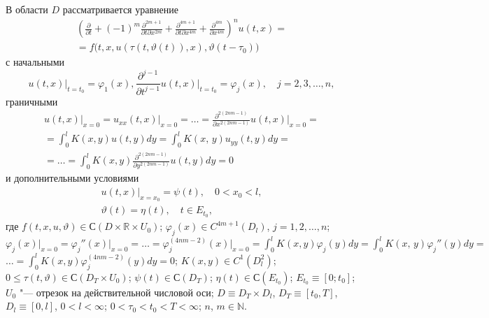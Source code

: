 

\date{25/I/2012}

\maketitle



 В области $D$ рассматривается
уравнение
\begin{multline}
\label{uld:eq1}
 \left( \frac{\partial}{\partial
t}+(-1)^m\frac{\partial ^{2m+1}}{\partial t \partial x^{2
m}}+\frac{\partial ^{4m+1}}{\partial t\partial x^{4
m}}+\frac{\partial ^{4
m}}{\partial  x^{4 m}}\right)^n u (t, x)=\\
 =f  \bigl(t , x ,  u (  \tau  (t, \vartheta  (t)), x ), \vartheta
 (t-\tau _0) \bigr)
\end{multline}
с начальными 
\begin{equation}
\label{uld:eq3}
u (t, x)\Big|_{t=t_0} =\varphi _1 ( x),  \frac{\partial^{j-1}}{\partial
t^{j-1}} u (t, x) \Big|_{t=t_0} =\varphi _j( x), \quad  j={2, 3, \dots, n},
\end{equation}
граничными 
\begin{multline}
\label{uld:eq3}
u (t, x) \big|_{x=0} =u_{ x x} (t , x) \big|_{ x=0}  = \ldots =\frac{\partial^{2(2 n m-1)}}{\partial
 x^{2 (2 n m-1)}} u (t,  x) \Big|_{x=0} = \\
 =\int_0^l K (x , y) u (t , y) d y=\int_0^l
K (x,\,y) u_{ y y}  (t, y) d y= \\
 =\ldots=\int_0^l K (x , y)  \frac{\partial
^{ 2 (2 n m-1)}}{\partial
 y^{ 2 (2 n m-1)}} u (t,  y) dy=0
 \end{multline}
 и дополнительными условиями
\begin{gather}
\label{uld:eq4}
u (t,  x) \big|_{x=x_0} = \psi(t), \quad  0<x_0<l,\\
\label{uld:eq5}
\vartheta  (t)=\eta(t), \quad  t \in E_{t_0},
\end{gather}
где $f (t, x, u, \vartheta) \in С (D \times \mathbb R \times U_0)$; 
$\varphi_j  (x) \in C^{4 m+1} (D_l)$, $j={1 , 2, \dots, n}$;
$\displaystyle \varphi_j (x) \big|_{x=0} =\varphi _j''(x) \big|_{x=0} {=}\ldots{=}\varphi _j^{(4 n m-2)} (x) \big|_{ x=0} {=}
\int_0^l K (x , y) \varphi _j (y) d y=\int_0^l K (x,\,y) \varphi _j''(y) d y
=$ $ \displaystyle\ldots {=}\int_0^l K (x , y) \varphi _j^{(4 n m-2)} (y) d y=0$;  
$K (x , y)\in C^1(D_l^2)$; 
$0\le \tau  (t , \vartheta )\in С (D_T \times U_0 )$; 
$\psi   (t)\in С (D_T)$; 
$\eta   (t)\in С (E_{ t_0} )$; 
$E_{t_0} \equiv [0 ;   t_0]$; 
$U_0$ "--- отрезок на действительной числовой оси; $D\equiv D_T \times D_l$, 
$D_T \equiv [t_0, T]$, $D_l \equiv [0 , l]$, $0<l<\infty$; $0<\tau _0 <t_0 <T<\infty$;
$n$, $m\in \mathbb N.$

